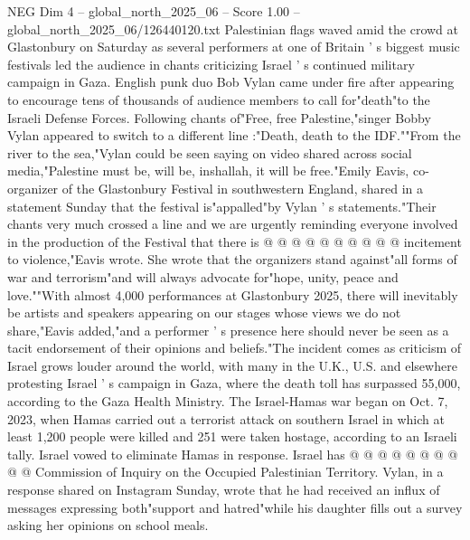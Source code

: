 \begin{textsample}{NEG Dim 4 – global\_north\_2025\_06 – Score 1.00 – global\_north\_2025\_06/126440120.txt}  \label{ex:f4_neg_074}
Palestinian flags waved amid the crowd at Glastonbury on Saturday as several performers at one of Britain ' s biggest music festivals led the audience in chants criticizing Israel ' s continued military campaign in Gaza.
English punk duo Bob Vylan came under fire after appearing to encourage tens of thousands of audience members to call for"death"to the Israeli Defense Forces.
Following chants of"Free, free Palestine,"singer Bobby Vylan appeared to switch to a different line :"Death, death to the IDF.""From the river to the sea,"Vylan could be seen saying on video shared across social media,"Palestine must be, will be, inshallah, it will be free."Emily Eavis, co-organizer of the Glastonbury Festival in southwestern England, shared in a statement Sunday that the festival is"appalled"by Vylan ' s statements."Their chants very much crossed a line and we are urgently reminding everyone involved in the production of the Festival that there is @ @ @ @ @ @ @ @ @ @ incitement to violence,"Eavis wrote.
She wrote that the organizers stand against"all forms of war and terrorism"and will always advocate for"hope, unity, peace and love.""With almost 4,000 performances at Glastonbury 2025, there will inevitably be artists and speakers appearing on our stages whose views we do not share,"Eavis added,"and a performer ' s presence here should never be seen as a tacit endorsement of their opinions and beliefs."The incident comes as criticism of Israel grows louder around the world, with many in the U.K., U.S. and elsewhere protesting Israel ' s campaign in Gaza, where the death toll has surpassed 55,000, according to the Gaza Health Ministry.
The Israel-Hamas war began on Oct. 7, 2023, when Hamas carried out a terrorist attack on southern Israel in which at least 1,200 people were killed and 251 were taken hostage, according to an Israeli tally.
Israel vowed to eliminate Hamas in response.
Israel has @ @ @ @ @ @ @ @ @ @ Commission of Inquiry on the Occupied Palestinian Territory.
Vylan, in a response shared on Instagram Sunday, wrote that he had received an influx of messages expressing both"support and hatred"while his daughter fills out a survey asking her opinions on school meals.

\end{textsample}
